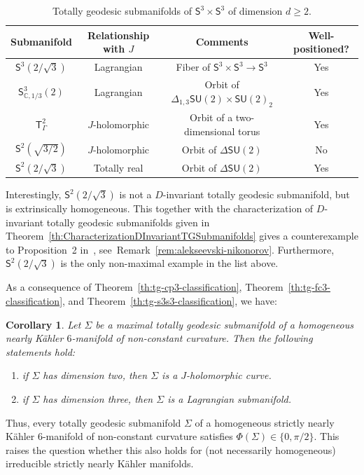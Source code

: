 \documentclass[11pt,a4paper,final]{amsart}
\newcommand{\s}{\mathsf}
\newcommand{\C}{\mathbb{C}}
\newtheorem{corx}[thmx]{Corollary}
\theoremstyle{definition}
\renewcommand{\arraystretch}{1.2}
\begin{document}
\begin{table}[h!]
	\centering
	\caption{Totally geodesic submanifolds of $\mathsf{S}^{3}\times\mathsf{S}^{3}$ of dimension $d\ge 2$.}
	\renewcommand{\arraystretch}{1.2}
	\begin{tabular}{cccc}
		\toprule 
		Submanifold & Relationship with $J$ & Comments & Well-positioned? \\
		\toprule
		$\mathsf{S}^{3}\left(2/\sqrt{3}\right)$ & Lagrangian & Fiber of $\mathsf{S}^{3}\times\mathsf{S}^{3}\to\mathsf{S}^{3}$ & Yes \\
		\hline
		$\mathsf{S}^{3}_{\C,1/3}(2)$ & Lagrangian & Orbit of $\Delta_{1,3}\mathsf{SU}(2)\times\mathsf{SU}(2)_{2}$ & Yes \\
		\hline
		$\mathsf{T}^2_{\Gamma}$ & $J$-holomorphic & Orbit of a two-dimensional torus & Yes \\
		\hline
		$\mathsf{S}^{2}(\sqrt{3/2})$ & $J$-holomorphic & Orbit of $\Delta\s{SU}(2)$ & No \\
		
		\hline
		$\mathsf{S}^{2}\left(2/\sqrt{3}\right)$ & Totally real & Orbit of $\Delta\s{SU}(2)$ & Yes \\
		\bottomrule
	\end{tabular}
	\label{table:S3S3}
\end{table}

Interestingly, $\s{S}^2(2/\sqrt{3})$ is not a $D$-invariant totally geodesic submanifold, but is extrinsically homogeneous.
This together with the characterization of $D$-invariant totally geodesic submanifolds given in Theorem~\ref{th:CharacterizationDInvariantTGSubmanifolds} gives a counterexample to Proposition~2 in~\cite{AlekseevskyNikonorov}, see~Remark~\ref{rem:alekseevski-nikonorov}. Furthermore, $\s{S}^2(2/\sqrt{3})$ is the only non-maximal example in the list above.

As a consequence of Theorem~\ref{th:tg-cp3-classification}, Theorem~\ref{th:tg-fc3-classification}, and Theorem~\ref{th:tg-s3s3-classification}, we have:

\begin{corx}\label{cor:tg-kahler-angle}
	Let $\Sigma$ be a maximal totally geodesic submanifold of a  homogeneous nearly Kähler $6$-manifold of non-constant curvature.
	Then the following statements hold:
	\begin{enumerate}[\rm (i)]
		\item if $\Sigma$ has dimension two, then $\Sigma$ is a $J$-holomorphic curve.
		\item if $\Sigma$ has dimension three, then $\Sigma$ is a Lagrangian submanifold.
	\end{enumerate}
\end{corx}
Thus, every totally geodesic submanifold $\Sigma$ of a homogeneous strictly nearly Kähler $6$-manifold of non-constant curvature satisfies $\Phi(\Sigma)\in\{0,\pi/2\}$.
This raises the question whether this also holds for  (not necessarily homogeneous) irreducible strictly nearly Kähler manifolds.
\end{document}
